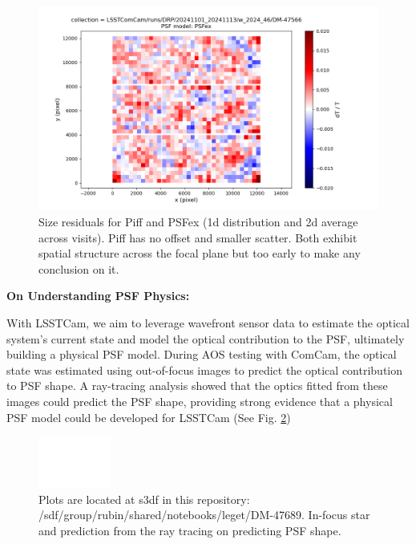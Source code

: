 \begin{figure}
	\includegraphics[scale=0.3]{figures/0_dT_2d_PSFex}
        \caption{\small Size residuals for Piff and PSFex (1d distribution and 2d average across visits). Piff has no offset and smaller scatter. Both exhibit spatial structure across the focal plane but too early to make any conclusion on it.}
        \label{DT_plot}
\end{figure}


\textbf{On Understanding PSF Physics:}


With LSSTCam, we aim to leverage wavefront sensor data to estimate the optical system's current state and model the optical contribution to the PSF, ultimately building a physical PSF model. During AOS testing with ComCam, the optical state was estimated using out-of-focus images to predict the optical contribution to PSF shape. A ray-tracing analysis showed that the optics fitted from these images could predict the PSF shape, providing strong evidence that a physical PSF model could be developed for LSSTCam (See  Fig. \ref{PSF_plot})


\begin{figure}
        \centering
        \includegraphics[scale=0.47]{figures/PSF_plot}
        \caption{\small Plots are located at s3df in this repository: /sdf/group/rubin/shared/notebooks/leget/DM-47689.  In-focus star and prediction from the ray tracing on predicting PSF shape.}
        \label{PSF_plot}
\end{figure}